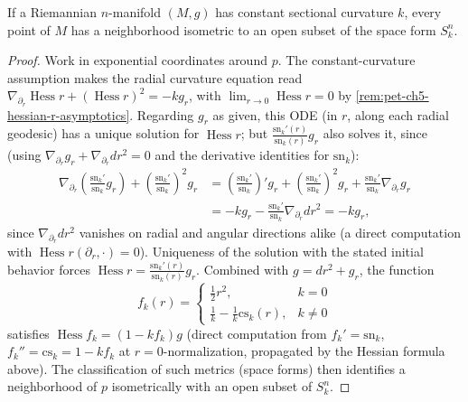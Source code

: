 \begin{theorem}
  \label{thm:pet-ch5-riemann-constant-curvature-local}
  If a Riemannian $n$-manifold $(M,g)$ has constant sectional curvature $k$, every
  point of $M$ has a neighborhood isometric to an open subset of the space form
  $S^n_k$.
\end{theorem}
\begin{proof}
  Work in exponential coordinates around $p$. The constant-curvature assumption
  makes the radial curvature equation read
  $\nabla_{\partial_r}\operatorname{Hess}r+(\operatorname{Hess}r)^2=-kg_r$, with
  $\lim_{r\to0}\operatorname{Hess}r=0$ by \cref{rem:pet-ch5-hessian-r-asymptotics}.
  Regarding $g_r$ as given, this ODE (in $r$, along each radial geodesic) has a
  unique solution for $\operatorname{Hess}r$; but $\tfrac{\mathrm{sn}_k'(r)}{\mathrm{sn}_k(r)}g_r$
  also solves it, since (using $\nabla_{\partial_r}g_r+\nabla_{\partial_r}dr^2=0$
  and the derivative identities for $\mathrm{sn}_k$):
  \begin{align*}
    \nabla_{\partial_r}\!\left(\frac{\mathrm{sn}_k'}{\mathrm{sn}_k}g_r\right)
    +\left(\frac{\mathrm{sn}_k'}{\mathrm{sn}_k}\right)^2g_r
    &=\left(\frac{\mathrm{sn}_k'}{\mathrm{sn}_k}\right)'g_r
    +\left(\frac{\mathrm{sn}_k'}{\mathrm{sn}_k}\right)^2g_r
    +\frac{\mathrm{sn}_k'}{\mathrm{sn}_k}\nabla_{\partial_r}g_r\\
    &=-kg_r-\frac{\mathrm{sn}_k'}{\mathrm{sn}_k}\nabla_{\partial_r}dr^2=-kg_r,
  \end{align*}
  since $\nabla_{\partial_r}dr^2$ vanishes on radial and angular directions alike (a
  direct computation with $\operatorname{Hess}r(\partial_r,\cdot)=0$). Uniqueness of
  the solution with the stated initial behavior forces
  $\operatorname{Hess}r=\tfrac{\mathrm{sn}_k'(r)}{\mathrm{sn}_k(r)}g_r$. Combined with
  $g=dr^2+g_r$, the function
  \[
    f_k(r)=\begin{cases}\tfrac12r^2,&k=0\\ \tfrac1k-\tfrac1k\mathrm{cs}_k(r),&k\ne0\end{cases}
  \]
  satisfies $\operatorname{Hess}f_k=(1-kf_k)g$ (direct computation from
  $f_k'=\mathrm{sn}_k$, $f_k''=\mathrm{cs}_k=1-kf_k$ at $r=0$-normalization, propagated
  by the Hessian formula above). The classification of such metrics (space forms) then
  identifies a neighborhood of $p$ isometrically with an open subset of $S^n_k$.
\end{proof}

